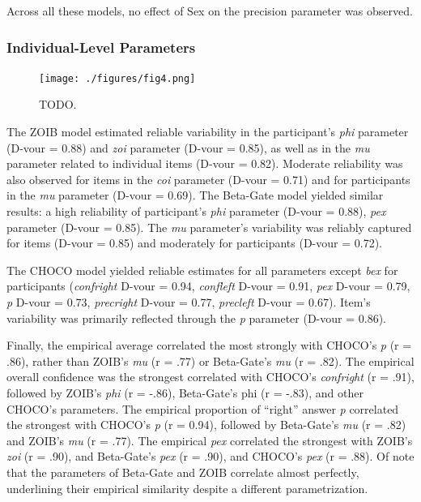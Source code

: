 \documentclass[
  jou,
  floatsintext,
  longtable,
  nolmodern,
  notxfonts,
  notimes,
  colorlinks=true,linkcolor=blue,citecolor=blue,urlcolor=blue]{apa7}
\begin{document}
Across all these models, no effect of Sex on the precision parameter was
observed.

\subsubsection{Individual-Level
Parameters}\label{individual-level-parameters}

\begin{figure}[!htbp]

{\caption{{TODO.}{\label{fig-four}}}}

\texttt{[image: ./figures/fig4.png]}

\end{figure}

The ZOIB model estimated reliable variability in the participant's
\emph{phi} parameter (D-vour = 0.88) and \emph{zoi} parameter (D-vour =
0.85), as well as in the \emph{mu} parameter related to individual items
(D-vour = 0.82). Moderate reliability was also observed for items in the
\emph{coi} parameter (D-vour = 0.71) and for participants in the
\emph{mu} parameter (D-vour = 0.69). The Beta-Gate model yielded similar
results: a high reliability of participant's \emph{phi} parameter
(D-vour = 0.88), \emph{pex} parameter (D-vour = 0.85). The \emph{mu}
parameter's variability was reliably captured for items (D-vour = 0.85)
and moderately for participants (D-vour = 0.72).

The CHOCO model yielded reliable estimates for all parameters except
\emph{bex} for participants (\emph{confright} D-vour = 0.94,
\emph{confleft} D-vour = 0.91, \emph{pex} D-vour = 0.79, \emph{p} D-vour
= 0.73, \emph{precright} D-vour = 0.77, \emph{precleft} D-vour = 0.67).
Item's variability was primarily reflected through the \emph{p}
parameter (D-vour = 0.86).

Finally, the empirical average correlated the most strongly with CHOCO's
\emph{p} (r = .86), rather than ZOIB's \emph{mu} (r = .77) or
Beta-Gate's \emph{mu} (r = .82). The empirical overall confidence was
the strongest correlated with CHOCO's \emph{confright} (r = .91),
followed by ZOIB's \emph{phi} (r = -.86), Beta-Gate's phi (r = -.83),
and other CHOCO's parameters. The empirical proportion of ``right''
answer \emph{p} correlated the strongest with CHOCO's \emph{p} (r =
0.94), followed by Beta-Gate's \emph{mu} (r = .82) and ZOIB's \emph{mu}
(r = .77). The empirical \emph{pex} correlated the strongest with ZOIB's
\emph{zoi} (r = .90), and Beta-Gate's \emph{pex} (r = .90), and CHOCO's
\emph{pex} (r = .88). Of note that the parameters of Beta-Gate and ZOIB
correlate almost perfectly, underlining their empirical similarity
despite a different parametrization.
\end{document}
